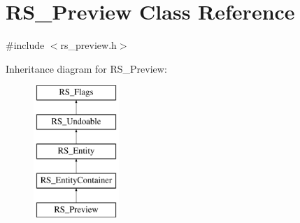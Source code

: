 \hypertarget{classRS__Preview}{\section{R\-S\-\_\-\-Preview Class Reference}
\label{classRS__Preview}
}


{\ttfamily \#include $<$rs\-\_\-preview.\-h$>$}

Inheritance diagram for R\-S\-\_\-\-Preview\-:\begin{figure}[H]
\begin{center}
\leavevmode
\includegraphics[height=5.000000cm]{classRS__Preview}
\end{center}
\end{figure}

